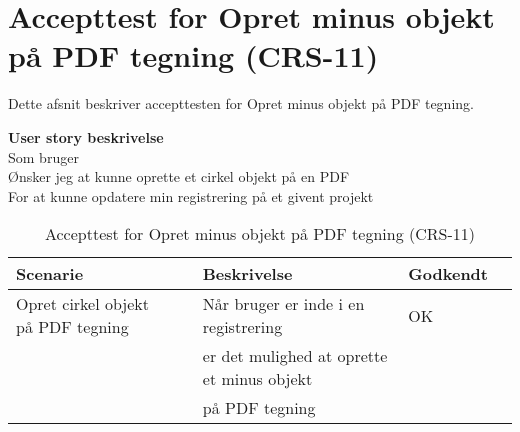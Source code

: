\section{Accepttest for Opret minus objekt på PDF tegning (CRS-11)}
Dette afsnit beskriver accepttesten for Opret minus objekt på PDF tegning.

\textbf{User story beskrivelse} \\
Som bruger \\
Ønsker jeg at kunne oprette et cirkel objekt på en PDF \\
For at kunne opdatere min registrering på et givent projekt

\begin{table}[H]
	\centering
	\begin{tabular}{|ll|l|ll|} \hline
		\textbf{Scenarie} &  & \textbf{Beskrivelse}&  \textbf{Godkendt}&  \\ \hline
		Opret cirkel objekt på PDF tegning&  &  Når bruger er inde i en registrering &  OK&  \\
		& & er det mulighed at oprette et minus objekt& & \\ 
		& & på PDF tegning& & \\ \hline
	\end{tabular}
	\caption{Accepttest for Opret minus objekt på PDF tegning (CRS-11)}
	\label{AcceptMinus}
\end{table}

\clearpage